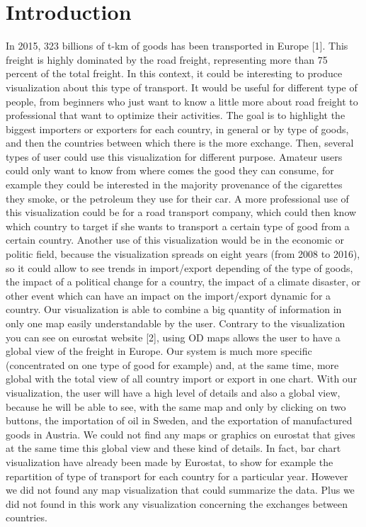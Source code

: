 \documentclass{vgtc}
\begin{document}
\section{Introduction}
In 2015, 323 billions of t-km of goods has been transported in Europe [1]. This freight is highly dominated by the road freight, representing more than 75 percent of the total freight. In this context, it could be interesting to produce visualization about this type of transport. It would be useful for different type of people, from beginners who just want to know a little more about road freight to professional that want to optimize their activities.
The goal is to highlight the biggest importers or exporters for each country, in general or by type of goods, and then the countries between which there is the more exchange. Then, several types of user could use this visualization for different purpose. 
Amateur users could only want to know from where comes the good they can consume, for example they could be interested in the majority provenance of the cigarettes they smoke, or the petroleum they use for their car.  
A more professional use of this visualization could be for a road transport company, which could then know which country to target if she wants to transport a certain type of good from a certain country.
Another use of this visualization would be in the economic or politic field, because the visualization spreads on eight years (from 2008 to 2016), so it could allow to see trends in import/export depending of the type of goods, the impact of a political change for a country, the impact of a climate disaster, or other event which can have an impact on the import/export dynamic for a country. 
Our visualization is able to combine a big quantity of information in only one map easily understandable by the user. Contrary to the visualization you can see on eurostat website [2], using OD maps allows the user to have a global view of the freight in Europe. Our system is much more specific (concentrated on one type of good for example) and, at the same time, more global with the total view of all country import or export in one chart. With our visualization, the user will have a high level of details and also a global view, because he will be able to see, with the same map and only by clicking on two buttons, the importation of oil in Sweden, and the exportation of manufactured goods in Austria. We could not find any maps or graphics on eurostat that gives at the same time this global view and these kind of details. In fact, bar chart visualization have already been made by Eurostat, to show for example the repartition of type of transport for each country for a particular year. However we did not found any map visualization that could summarize the data. Plus we did not found in this work any visualization concerning the exchanges between countries.
\end{document}
